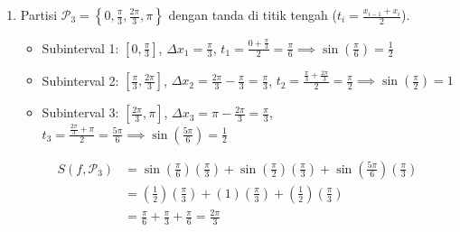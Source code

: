 \documentclass[11pt,letterpaper]{article}
\begin{document}
\begin{enumerate}
\begin{enumerate}[label=\alph*)]
          \item Partisi $\mathcal{P}_3 = \left\{0, \frac{\pi}{3}, \frac{2\pi}{3}, \pi\right\}$ dengan tanda di titik tengah ($t_i = \frac{x_{i-1} + x_i}{2}$).
                \begin{itemize}
                  \item Subinterval 1: $\left[0, \frac{\pi}{3}\right]$, $\Delta x_1 = \frac{\pi}{3}$, $t_1 = \frac{0 + \frac{\pi}{3}}{2} = \frac{\pi}{6} \implies \sin\left(\frac{\pi}{6}\right) = \frac{1}{2}$
                  \item Subinterval 2: $\left[\frac{\pi}{3}, \frac{2\pi}{3}\right]$, $\Delta x_2 = \frac{2\pi}{3} - \frac{\pi}{3} = \frac{\pi}{3}$, $t_2 = \frac{\frac{\pi}{3} + \frac{2\pi}{3}}{2} = \frac{\pi}{2} \implies \sin\left(\frac{\pi}{2}\right) = 1$
                  \item Subinterval 3: $\left[\frac{2\pi}{3}, \pi\right]$, $\Delta x_3 = \pi - \frac{2\pi}{3} = \frac{\pi}{3}$, $t_3 = \frac{\frac{2\pi}{3} + \pi}{2} = \frac{5\pi}{6} \implies \sin\left(\frac{5\pi}{6}\right) = \frac{1}{2}$
                \end{itemize}
                \begin{align*}
                  S(f, \mathcal{P}_3) & = \sin\left(\frac{\pi}{6}\right)\left(\frac{\pi}{3}\right) + \sin\left(\frac{\pi}{2}\right)\left(\frac{\pi}{3}\right) + \sin\left(\frac{5\pi}{6}\right)\left(\frac{\pi}{3}\right) \\
                                      & = \left(\frac{1}{2}\right)\left(\frac{\pi}{3}\right) + (1)\left(\frac{\pi}{3}\right) + \left(\frac{1}{2}\right)\left(\frac{\pi}{3}\right)                                         \\
                                      & = \frac{\pi}{6} + \frac{\pi}{3} + \frac{\pi}{6} = \frac{2\pi}{3}
                \end{align*}
        \end{enumerate}


\end{enumerate}
\end{document}

